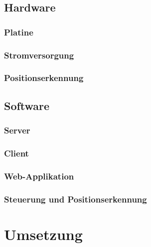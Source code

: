 \section{Hardware}
\subsection{Platine}
\subsection{Stromversorgung}
\subsection{Positionserkennung}

\section{Software}
\subsection{Server}
\subsection{Client}
\subsection{Web-Applikation}
\subsection{Steuerung und Positionserkennung}

\chapter{Umsetzung}

\lipsum